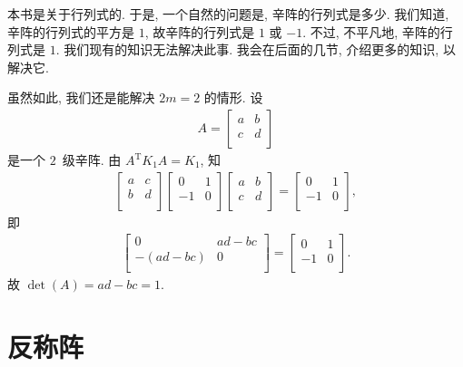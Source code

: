 \documentclass[../libro.tex]{subfiles}
\begin{document}
本书是关于行列式的.
于是, 一个自然的问题是, 辛阵的行列式是多少.
我们知道, 辛阵的行列式的平方是 \(1\),
故辛阵的行列式是 \(1\) 或 \(-1\).
不过, 不平凡地, 辛阵的行列式是 \(1\).
我们现有的知识无法解决此事.
我会在后面的几节, 介绍更多的知识, 以解决它.

虽然如此, 我们还是能解决 \(2m = 2\) 的情形.
设
\begin{align*}
    A =
    \begin{bmatrix}
        a & b \\
        c & d \\
    \end{bmatrix}
\end{align*}
是一个 \(2\)~级辛阵.
由 \(A^{\mathrm{T}} K_1 A = K_1\), 知
\begin{align*}
    \begin{bmatrix}
        a & c \\
        b & d \\
    \end{bmatrix}
    \begin{bmatrix}
        0  & 1 \\
        -1 & 0 \\
    \end{bmatrix}
    \begin{bmatrix}
        a & b \\
        c & d \\
    \end{bmatrix}
    =
    \begin{bmatrix}
        0  & 1 \\
        -1 & 0 \\
    \end{bmatrix},
\end{align*}
即
\begin{align*}
    \begin{bmatrix}
        0          & ad - bc \\
        -(ad - bc) & 0       \\
    \end{bmatrix}
    =
    \begin{bmatrix}
        0  & 1 \\
        -1 & 0 \\
    \end{bmatrix}.
\end{align*}
故
\(\det {(A)} = ad - bc = 1\).

\section{反称阵}
\end{document}
